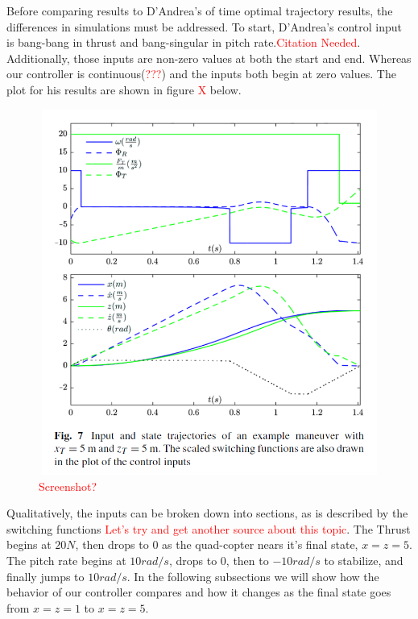 \documentclass[12pt]{article}
\begin{document}
Before comparing results to D'Andrea's of time optimal trajectory results, the differences in simulations must be addressed. To start, D'Andrea's control input is bang-bang in thrust and bang-singular in pitch rate.\textcolor{red}{Citation Needed}. Additionally, those inputs are non-zero values at both the start and end. Whereas our controller is continuous(\textcolor{red}{???}) and the inputs both begin at zero values. The plot for his results are shown in figure \textcolor{red}{X} below. 
\begin{figure}[H]
\centerline{\includegraphics[width=12cm, height=12cm]{DAndrea_55_Plot.png}}
  \caption{\textcolor{red}{Screenshot?}}
  \label{fig}
\end{figure}
Qualitatively, the inputs can be broken down into sections, as is described by the switching functions \textcolor{red}{Let's try and get another source about this topic}. The Thrust begins at $20 N$, then drops to 0 as the quad-copter nears it's final state, $x=z=5$. The pitch rate begins at $10 rad/s$, drops to $0$, then to $-10 rad/s$ to stabilize, and finally jumps to $10 rad/s$. 
\newline
\newline
In the following subsections we will show how the behavior of our controller compares and how it changes as the final state goes from $x=z=1$ to $x=z=5$.
\end{document}
